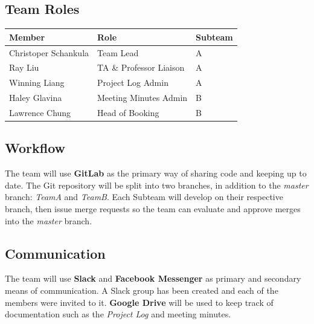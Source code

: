 \documentclass{article}
\begin{document}
\subsection{Team Roles}
\begin{table}[h]
	\centering
	\begin{tabular}{p{0.20\hsize}p{0.30\hsize}p{0.10\hsize}}
		\toprule
		\textbf{Member} & \textbf{Role} & \textbf{Subteam}\\
		\midrule
		Christoper Schankula & Team Lead & A\\		
		\midrule
		Ray Liu & TA \& Professor Liaison & A\\	
		\midrule
		Winning Liang & Project Log Admin & A\\		
		\midrule
		Haley Glavina & Meeting Minutes Admin & B\\	
		\midrule
		Lawrence Chung & Head of Booking & B\\
		\bottomrule
	\end{tabular}
\end{table}

\subsection{Workflow}

The team will use \textbf{GitLab} as the primary way of sharing code and keeping up to date. The Git repository will be split into two branches, in addition to the \textit{master} branch: \textit{TeamA} and \textit{TeamB}. Each Subteam will develop on their respective branch, then issue merge requests so the team can evaluate and approve merges into the \textit{master} branch.

\subsection{Communication}

The team will use \textbf{Slack} and \textbf{Facebook Messenger} as primary and secondary means of communication. A Slack group has been created and each of the members were invited to it. \textbf{Google Drive} will be used to keep track of documentation such as the \textit{Project Log} and meeting minutes.

\clearpage


\end{document}
